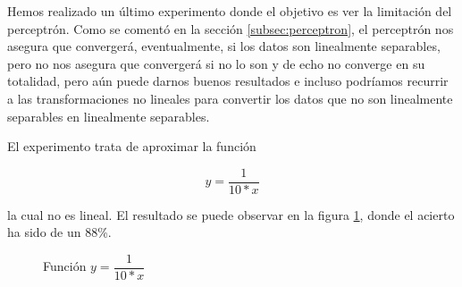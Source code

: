 Hemos realizado un último experimento donde el objetivo es ver la limitación del perceptrón. Como se comentó en la sección \ref{subsec:perceptron}, el perceptrón nos asegura que convergerá, eventualmente, si los datos son linealmente separables, pero no nos asegura que convergerá si no lo son y de echo no converge en su totalidad, pero aún puede darnos buenos resultados e incluso podríamos recurrir a las transformaciones no lineales para convertir los datos que no son linealmente separables en linealmente separables.

El experimento trata de aproximar la función

\[y=\dfrac{1}{10*x}\]

la cual no es lineal. El resultado se puede observar en la figura \ref{fig:perceptronFunction5Experiment}, donde el acierto ha sido de un 88\%.

\begin{figure}[H]
    \centering
    
    
    \caption{Función $y=\dfrac{1}{10*x}$}
    \label{fig:perceptronFunction5Experiment}
\end{figure}

